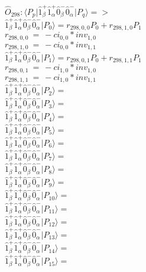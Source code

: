 \documentclass[14pt]{article}
\begin{document}
    $\hat{O}_{298}:  \langle{P_p}\vert \hat{1}_{\beta}^{+}\hat{1}_{\alpha}^{+}\hat{0}_{\beta}^{-}\hat{0}_{\alpha}^{-} \vert{P_q}\rangle => $ \\ 
    $ \hat{1}_{\beta}^{+}\hat{1}_{\alpha}^{+}\hat{0}_{\beta}^{-}\hat{0}_{\alpha}^{-} \vert{P_{0}}\rangle = {r}_{298,0,0}P_{0}+{r}_{298,1,0}P_{1} $ \\ 
    ${r}_{298,0,0}\ =\ -{ci}_{0,0}*{inv}_{1,0} $ \\ 
    ${r}_{298,1,0}\ =\ -{ci}_{0,0}*{inv}_{1,1} $ \\ 
    $ \hat{1}_{\beta}^{+}\hat{1}_{\alpha}^{+}\hat{0}_{\beta}^{-}\hat{0}_{\alpha}^{-} \vert{P_{1}}\rangle = {r}_{298,0,1}P_{0}+{r}_{298,1,1}P_{1} $ \\ 
    ${r}_{298,0,1}\ =\ -{ci}_{1,0}*{inv}_{1,0} $ \\ 
    ${r}_{298,1,1}\ =\ -{ci}_{1,0}*{inv}_{1,1} $ \\ 
    $ \hat{1}_{\beta}^{+}\hat{1}_{\alpha}^{+}\hat{0}_{\beta}^{-}\hat{0}_{\alpha}^{-} \vert{P_{2}}\rangle =  $ \\ 
    $ \hat{1}_{\beta}^{+}\hat{1}_{\alpha}^{+}\hat{0}_{\beta}^{-}\hat{0}_{\alpha}^{-} \vert{P_{3}}\rangle =  $ \\ 
    $ \hat{1}_{\beta}^{+}\hat{1}_{\alpha}^{+}\hat{0}_{\beta}^{-}\hat{0}_{\alpha}^{-} \vert{P_{4}}\rangle =  $ \\ 
    $ \hat{1}_{\beta}^{+}\hat{1}_{\alpha}^{+}\hat{0}_{\beta}^{-}\hat{0}_{\alpha}^{-} \vert{P_{5}}\rangle =  $ \\ 
    $ \hat{1}_{\beta}^{+}\hat{1}_{\alpha}^{+}\hat{0}_{\beta}^{-}\hat{0}_{\alpha}^{-} \vert{P_{6}}\rangle =  $ \\ 
    $ \hat{1}_{\beta}^{+}\hat{1}_{\alpha}^{+}\hat{0}_{\beta}^{-}\hat{0}_{\alpha}^{-} \vert{P_{7}}\rangle =  $ \\ 
    $ \hat{1}_{\beta}^{+}\hat{1}_{\alpha}^{+}\hat{0}_{\beta}^{-}\hat{0}_{\alpha}^{-} \vert{P_{8}}\rangle =  $ \\ 
    $ \hat{1}_{\beta}^{+}\hat{1}_{\alpha}^{+}\hat{0}_{\beta}^{-}\hat{0}_{\alpha}^{-} \vert{P_{9}}\rangle =  $ \\ 
    $ \hat{1}_{\beta}^{+}\hat{1}_{\alpha}^{+}\hat{0}_{\beta}^{-}\hat{0}_{\alpha}^{-} \vert{P_{10}}\rangle =  $ \\ 
    $ \hat{1}_{\beta}^{+}\hat{1}_{\alpha}^{+}\hat{0}_{\beta}^{-}\hat{0}_{\alpha}^{-} \vert{P_{11}}\rangle =  $ \\ 
    $ \hat{1}_{\beta}^{+}\hat{1}_{\alpha}^{+}\hat{0}_{\beta}^{-}\hat{0}_{\alpha}^{-} \vert{P_{12}}\rangle =  $ \\ 
    $ \hat{1}_{\beta}^{+}\hat{1}_{\alpha}^{+}\hat{0}_{\beta}^{-}\hat{0}_{\alpha}^{-} \vert{P_{13}}\rangle =  $ \\ 
    $ \hat{1}_{\beta}^{+}\hat{1}_{\alpha}^{+}\hat{0}_{\beta}^{-}\hat{0}_{\alpha}^{-} \vert{P_{14}}\rangle =  $ \\ 
    $ \hat{1}_{\beta}^{+}\hat{1}_{\alpha}^{+}\hat{0}_{\beta}^{-}\hat{0}_{\alpha}^{-} \vert{P_{15}}\rangle =  $ \\ 
    
\end{document}
